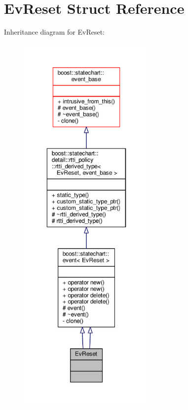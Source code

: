 \hypertarget{struct_ev_reset}{}\section{Ev\+Reset Struct Reference}
\label{struct_ev_reset}


Inheritance diagram for Ev\+Reset\+:
\nopagebreak
\begin{figure}[H]
\begin{center}
\leavevmode
\includegraphics[height=550pt]{struct_ev_reset__inherit__graph}
\end{center}
\end{figure}


